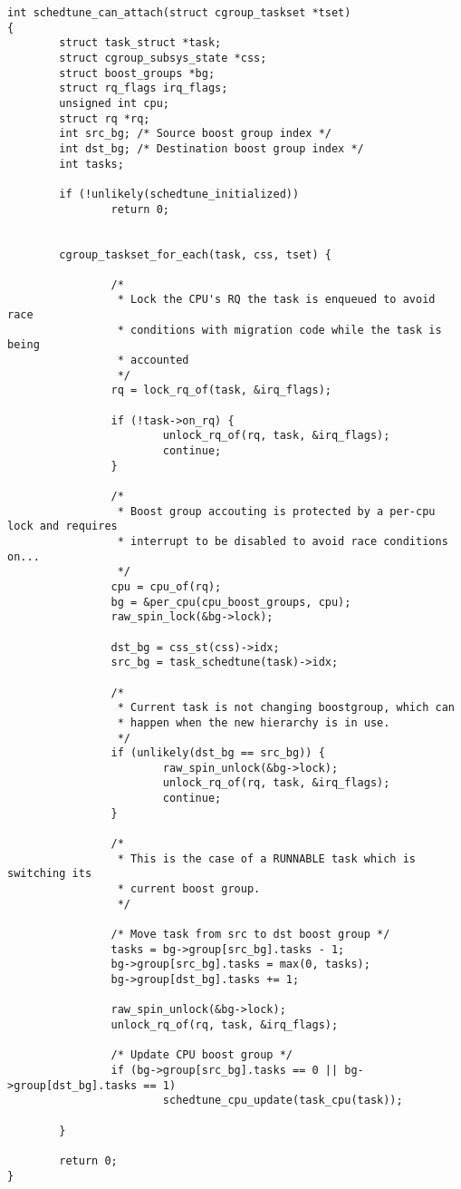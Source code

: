 \documentclass{article}
\begin{document}
\begin{verbatim}
int schedtune_can_attach(struct cgroup_taskset *tset)
{
        struct task_struct *task;
        struct cgroup_subsys_state *css;
        struct boost_groups *bg;
        struct rq_flags irq_flags;
        unsigned int cpu;
        struct rq *rq;
        int src_bg; /* Source boost group index */
        int dst_bg; /* Destination boost group index */
        int tasks;

        if (!unlikely(schedtune_initialized))
                return 0;


        cgroup_taskset_for_each(task, css, tset) {

                /*
                 * Lock the CPU's RQ the task is enqueued to avoid race
                 * conditions with migration code while the task is being
                 * accounted
                 */
                rq = lock_rq_of(task, &irq_flags);

                if (!task->on_rq) {
                        unlock_rq_of(rq, task, &irq_flags);
                        continue;
                }

                /*
                 * Boost group accouting is protected by a per-cpu lock and requires
                 * interrupt to be disabled to avoid race conditions on...
                 */
                cpu = cpu_of(rq);
                bg = &per_cpu(cpu_boost_groups, cpu);
                raw_spin_lock(&bg->lock);

                dst_bg = css_st(css)->idx;
                src_bg = task_schedtune(task)->idx;

                /*
                 * Current task is not changing boostgroup, which can
                 * happen when the new hierarchy is in use.
                 */
                if (unlikely(dst_bg == src_bg)) {
                        raw_spin_unlock(&bg->lock);
                        unlock_rq_of(rq, task, &irq_flags);
                        continue;
                }

                /*
                 * This is the case of a RUNNABLE task which is switching its
                 * current boost group.
                 */

                /* Move task from src to dst boost group */
                tasks = bg->group[src_bg].tasks - 1;
                bg->group[src_bg].tasks = max(0, tasks);
                bg->group[dst_bg].tasks += 1;

                raw_spin_unlock(&bg->lock);
                unlock_rq_of(rq, task, &irq_flags);

                /* Update CPU boost group */
                if (bg->group[src_bg].tasks == 0 || bg->group[dst_bg].tasks == 1)
                        schedtune_cpu_update(task_cpu(task));

        }

        return 0;
}
\end{verbatim}
\end{document}
